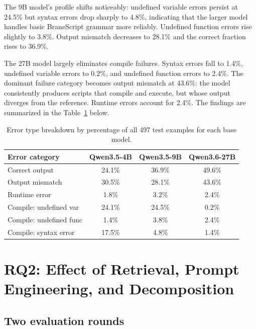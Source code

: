 The 9B model's profile shifts noticeably: undefined variable errors persist
at 24.5\% but syntax errors drop sharply to 4.8\%, indicating that the larger
model handles basic BraneScript grammar more reliably. Undefined function
errors rise slightly to 3.8\%. Output mismatch decreases to 28.1\% and the
correct fraction rises to 36.9\%.

The 27B model largely eliminates compile failures. Syntax errors fall to 1.4\%,
undefined variable errors to 0.2\%, and undefined function errors to 2.4\%.
The dominant failure category becomes output mismatch at 43.6\%: the model
consistently produces scripts that compile and execute, but whose output
diverges from the reference. Runtime errors account for 2.4\%. The findings are summarized 
in the Table~\ref{tab:error-breakdown} below.

\begin{table}[H]
\centering
\caption{Error type breakdown by percentage of all 497 test examples for each base model.}
\label{tab:error-breakdown}
\begin{tabular}{lccc}
\hline
\textbf{Error category} & \textbf{Qwen3.5-4B} & \textbf{Qwen3.5-9B} & \textbf{Qwen3.6-27B} \\
\hline
Correct output          & 24.1\% & 36.9\% & 49.6\% \\
Output mismatch         & 30.5\% & 28.1\% & 43.6\% \\
Runtime error           &  1.8\% &  3.2\% &  2.4\% \\
Compile: undefined var  & 24.1\% & 24.5\% &  0.2\% \\
Compile: undefined func &  1.4\% &  3.8\% &  2.4\% \\
Compile: syntax error   & 17.5\% &  4.8\% &  1.4\% \\
\hline
\end{tabular}
\end{table}

\section{RQ2: Effect of Retrieval, Prompt Engineering, and Decomposition}
\label{s:eval-rq2}

\subsection{Two evaluation rounds}\label{s:eval-rounds}

